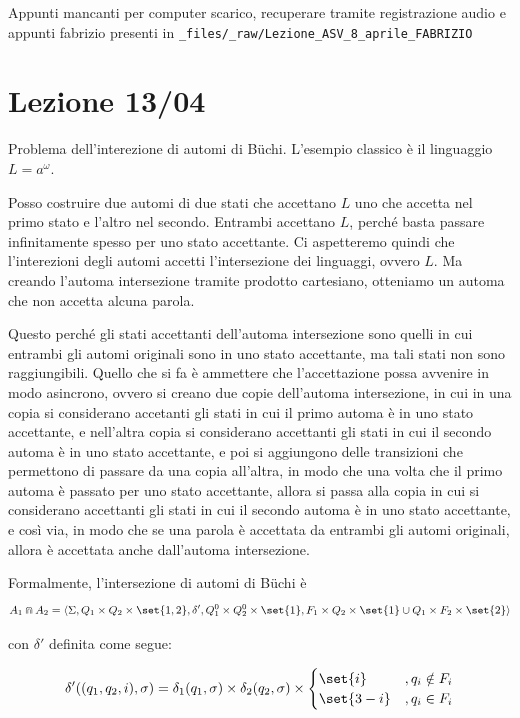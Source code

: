 Appunti mancanti per computer scarico, recuperare tramite registrazione audio e appunti fabrizio presenti in \lstinline{_files/_raw/Lezione_ASV_8_aprile_FABRIZIO}

\chapter{Lezione 13/04}

Problema dell'interezione di automi di Büchi.
L'esempio classico è il linguaggio \(L=a^\omega\).

Posso costruire due automi di due stati che accettano \(L\) uno che accetta nel primo stato e l'altro nel secondo.
Entrambi accettano \(L\), perché basta passare infinitamente spesso per uno stato accettante.
Ci aspetteremo quindi che l'interezioni degli automi accetti l'intersezione dei linguaggi, ovvero \(L\).
Ma creando l'automa intersezione tramite prodotto cartesiano, otteniamo un automa che non accetta alcuna parola.

Questo perché gli stati accettanti dell'automa intersezione sono quelli in cui entrambi gli automi originali sono in uno stato accettante, ma tali stati non sono raggiungibili.
Quello che si fa è ammettere che l'accettazione possa avvenire in modo asincrono, ovvero si creano due copie dell'automa intersezione, in cui in una copia si considerano accetanti gli stati in cui il primo automa è in uno stato accettante, e nell'altra copia si considerano accettanti gli stati in cui il secondo automa è in uno stato accettante, e poi si aggiungono delle transizioni che permettono di passare da una copia all'altra, in modo che una volta che il primo automa è passato per uno stato accettante, allora si passa alla copia in cui si considerano accettanti gli stati in cui il secondo automa è in uno stato accettante, e così via, in modo che se una parola è accettata da entrambi gli automi originali, allora è accettata anche dall'automa intersezione.

Formalmente, l'intersezione di automi di Büchi è
\[A_1 \Cap A_2 = \langle\Sigma, Q_1 \times Q_2\times\set{1,2}, \delta', Q_1^0 \times Q_2^0\times\set{1}, F_1 \times Q_2\times\set{1}\cup Q_1\times F_2\times\set{2} \rangle \]

con \(\delta'\) definita come segue:

\[\delta'((q_1,q_2,i),\sigma)=\delta_1(q_1,\sigma)\times\delta_2(q_2,\sigma)\times\begin{cases}
    \set{i}   & ,q_i\notin F_i \\
    \set{3-i} & ,q_i\in F_i
  \end{cases}\]

